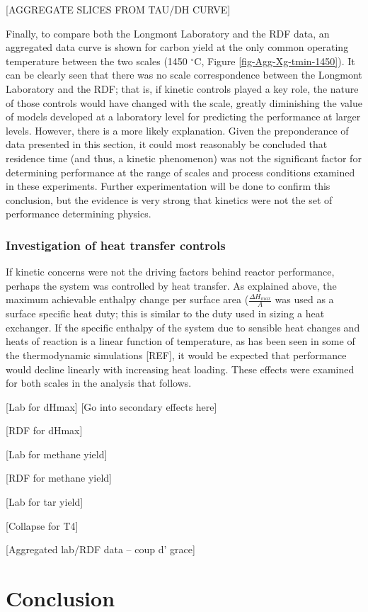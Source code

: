 \documentclass[11pt,twocolumn]{article}
\begin{document}
[AGGREGATE SLICES FROM TAU/DH CURVE]

Finally, to compare both the Longmont Laboratory and the RDF data, an aggregated data curve is shown for carbon yield at the only common operating temperature between the two scales (1450 $^{\circ}$C, Figure \ref{fig-Agg-Xg-tmin-1450}).  It can be clearly seen that there was no scale correspondence between the Longmont Laboratory and the RDF; that is, if kinetic controls played a key role, the nature of those controls would have changed with the scale, greatly diminishing the value of models developed at a laboratory level for predicting the performance at larger levels.  However, there is a more likely explanation.  Given the preponderance of data presented in this section, it could most reasonably be concluded that residence time (and thus, a kinetic phenomenon) was not the significant factor for determining performance at the range of scales and process conditions examined in these experiments.  Further experimentation will be done to confirm this conclusion, but the evidence is very strong that kinetics were not the set of performance determining physics.

\subsubsection*{Investigation of heat transfer controls}

If kinetic concerns were not the driving factors behind reactor performance, perhaps the system was controlled by heat transfer.  As explained above, the maximum achievable enthalpy change per surface area ($\frac{\Delta H_{max}}{A}$ was used as a surface specific heat duty; this is similar to the duty used in sizing a heat exchanger.  If the specific enthalpy of the system due to sensible heat changes and heats of reaction is a linear function of temperature, as has been seen in some of the thermodynamic simulations [REF], it would be expected that performance would decline linearly with increasing heat loading.  These effects were examined for both scales in the analysis that follows.



[Lab for dHmax]
[Go into secondary effects here]

[RDF for dHmax]

[Lab for methane yield]

[RDF for methane yield]

[Lab for tar yield]

[Collapse for T4]

[Aggregated lab/RDF data -- coup d' grace]


\section*{Conclusion}



\newpage
\appendix
\onecolumn
\end{document}
